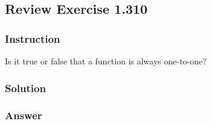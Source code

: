 \subsection*{Review Exercise 1.310}

\subsubsection*{Instruction}

Is it true or false that a function is always one-to-one?

\subsubsection*{Solution}

\subsubsection*{Answer}
